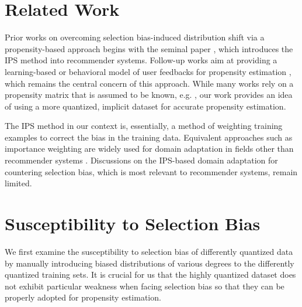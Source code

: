 \documentclass{article}
\begin{document}
\section{Related Work}
Prior works on overcoming selection bias-induced distribution shift via a propensity-based approach begins with the seminal paper \cite{schnabel2016recommendations}, which introduces the IPS method into recommender systems. Follow-up works aim at providing a learning-based or behavioral model of user feedbacks for propensity estimation \cite{joachims2017unbiased} \cite{yang2018unbiased}, which remains the central concern of this approach. While many works rely on a propensity matrix that is assumed to be known, e.g. \cite{something}, our work provides an idea of using a more quantized, implicit dataset for accurate propensity estimation.

The IPS method in our context is, essentially, a method of weighting training examples to correct the bias in the training data. Equivalent approaches such as importance weighting are widely used for domain adaptation in fields other than recommender systems \cite{sugiyama2007covariate} \cite{zhang2018importance}. Discussions on the IPS-based domain adaptation for countering selection bias, which is most relevant to recommender systems, remain limited.

\section{Susceptibility to Selection Bias}
We first examine the susceptibility to selection bias of differently quantized data by manually introducing biased distributions of various degrees to the differently quantized training sets. It is crucial for us that the highly quantized dataset does not exhibit particular weakness when facing selection bias so that they can be properly adopted for propensity estimation.
\end{document}
